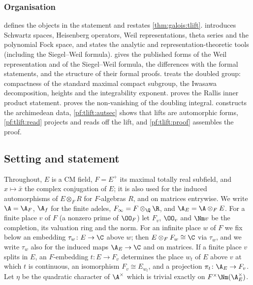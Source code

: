 \subsubsection*{Organisation}
 defines the objects in the statement and restates \cref{thm:galois:tlift}.
 introduces Schwartz spaces, Heisenberg operators, Weil representations, theta
series and the polynomial Fock space, and states the analytic and representation-theoretic tools
(including the Siegel--Weil formula).  gives the published forms of the Weil
representation and of the Siegel--Weil formula, the differences with the formal statements, and the structure of
their formal proofs.  treats the doubled group: compactness of the standard maximal compact
subgroup, the Iwasawa decomposition, heights and the integrability exponent. 
proves the Rallis inner product statement.  proves the non-vanishing of the
doubling integral.  constructs the archimedean data, \cref{pf:tlift:autsec} shows that
lifts are automorphic forms, \cref{pf:tlift:read} projects and reads off the lift, and
\cref{pf:tlift:proof} assembles the proof.

\subsection{Setting and statement}\label{pf:tlift:setting}

Throughout, $E$ is a CM field, $F=E^+$ its maximal totally real subfield, and $x\mapsto\bar x$ the
complex conjugation of $E$; it is also used for the induced automorphisms of $E\otimes_FR$ for
$F$-algebras $R$, and on matrices entrywise. We write $\A=\A_F$, $\A_f$ for the finite adeles,
$F_\infty=F\otimes_\Q\R$, and $\tliftAE=\A\otimes_FE$. For a finite place $v$ of $F$ (a nonzero prime of
$\OO_F$) let $F_v$, $\OO_v$ and $\Nm v$ be the completion, its valuation ring and the norm. For an
infinite place $w$ of $F$ we fix below an embedding $\tau_w\colon E\to\C$ above $w$; then
$E\otimes_FF_w\cong\C$ via $\tau_w$, and we write $\tau_w$ also for the induced maps $\tliftAE\to\C$ and on
matrices. If a finite place $v$ splits in $E$, an $F$-embedding $t\colon E\to F_v$ determines the place
$w_t$ of $E$ above $v$ at which $t$ is continuous, an isomorphism $F_v\cong E_{w_t}$, and a projection
$\pi_t\colon\tliftAE\to F_v$. Let $\eta$ be the quadratic character of $\A^\times$ which is trivial
exactly on $F^\times\Nm(\tliftAE^\times)$.

